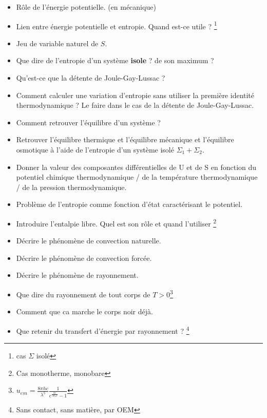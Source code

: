 \documentclass[a4paper, 11pt, hidelinks]{article}
\begin{document}
\begin{itemize}
    \item Rôle de l'énergie potentielle. (en mécanique) \cite{Chapitre1bis}
    \item Lien entre énergie potentielle et entropie. Quand est-ce utile ? \footnote{cas $\Sigma$ isolé} \cite{Chapitre1bis}
    \item Jeu de variable naturel de $S$. \cite{Chapitre1bis}
    \item Que dire de l'entropie d'un système \textbf{isole} ? de son maximum ? \cite{Chapitre1bis}
    \item Qu'est-ce que la détente de Joule-Gay-Lussac ? \cite{Chapitre1bis}
    \item Comment calculer une variation d'entropie sans utiliser la première identité thermodynamique ? Le faire dans le cas de la détente de Joule-Gay-Lussac. \cite{Chapitre1bis}
    \item Comment retrouver l'équilibre d'un système ? \cite{Chapitre1bis}
    \item Retrouver l'équilibre thermique et l'équilibre mécanique et l'équilibre osmotique à l'aide de l'entropie d'un système isolé $\Sigma_1 + \Sigma_2$. \cite{Chapitre1bis}
    \item Donner la valeur des composantes différentielles de U et de S en fonction du potentiel chimique thermodynamique / de la température thermodynamique / de la pression thermodynamique. \cite{Chapitre1bis}
    \item Problème de l'entropie comme fonction d'état caractérisant le potentiel. \cite{Chapitre1bis}
    \item Introduire l'entalpie libre. Quel est son rôle et quand l'utiliser \footnote{Cas monotherme, monobare} \cite{Chapitre1bis}
    \item Décrire le phénomène de convection naturelle. \cite{Chapitre20}
    \item Décrire le phénomène de convection forcée. \cite{Chapitre20}
    \item Décrire le phénomène de rayonnement. \cite{Chapitre20}
    \item Que dire du rayonnement de tout corps de $T>0$\footnote{$u_{em}=\frac{8\pi h c }{\lambda^5} \frac{1}{e^{\frac{hc}{\lambda k_b T}}-1}$} \cite{Chapitre20}
    \item Comment que ca marche le corps noir déjà. \cite{Chapitre20}
    \item Que retenir du transfert d'énergie par rayonnement ? \footnote{Sans contact, sans matière, par OEM} \cite{Chapitre20}

\end{itemize}
\end{document}
